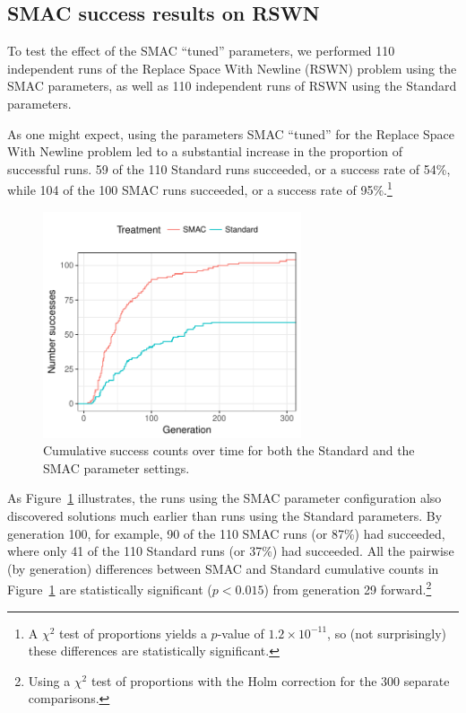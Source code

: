\subsection{SMAC success results on RSWN}
\label{sec:SMACresultsRSWN}

To test the effect of the SMAC ``tuned'' parameters, we performed 110
independent runs of the Replace Space With Newline (RSWN) problem using the
SMAC parameters, as well as 110 independent runs of RSWN using the
Standard parameters.

As one might expect, using the parameters SMAC ``tuned'' for the
Replace Space With Newline problem led to a 
substantial increase in the proportion of successful runs. 59 of 
the 110 Standard runs succeeded, or a success rate of 54\%, while 104 of the
100 SMAC runs succeeded, or a success rate of 95\%.\footnote{A $\chi^2$ test of 
proportions yields a $p$-value of $1.2 \times 10^{-11}$, so (not surprisingly)
these differences are statistically significant.}

\begin{figure}
	\includegraphics[width=3in]{../figures/successGenerations}
	\caption{Cumulative success counts over time for both the Standard
	and the SMAC parameter settings.}
	\label{fig:successGenerations}
\end{figure}

As Figure~\ref{fig:successGenerations} illustrates, the runs using the SMAC
parameter configuration also discovered solutions much earlier than runs using
the Standard parameters. By generation 100, for example, 90 of the 110 SMAC 
runs (or 87\%) had succeeded, where only 41 of the 110 Standard runs 
(or 37\%) had succeeded. All the pairwise (by generation) differences 
between SMAC and Standard cumulative counts in 
Figure~\ref{fig:successGenerations} are 
statistically significant ($p<0.015$)
from generation 29 forward.\footnote{Using a $\chi^2$ test of proportions 
	with the Holm correction for the 300 separate comparisons.}

